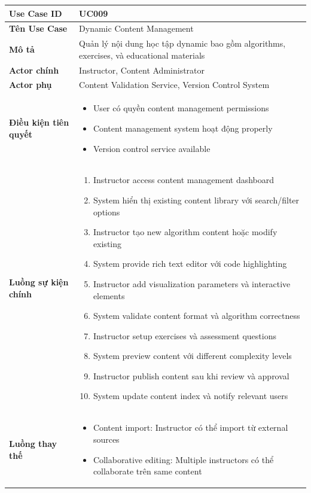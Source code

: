 \begin{longtable}{|p{4cm}|p{10cm}|}
\hline
\textbf{Use Case ID} & UC009 \\ \hline
\textbf{Tên Use Case} & Dynamic Content Management \\ \hline
\textbf{Mô tả} & Quản lý nội dung học tập dynamic bao gồm algorithms, exercises, và educational materials \\ \hline
\textbf{Actor chính} & Instructor, Content Administrator \\ \hline
\textbf{Actor phụ} & Content Validation Service, Version Control System \\ \hline
\textbf{Điều kiện tiên quyết} & 
\begin{itemize}
    \item User có quyền content management permissions
    \item Content management system hoạt động properly
    \item Version control service available
\end{itemize} \\ \hline
\textbf{Luồng sự kiện chính} & 
\begin{enumerate}
    \item Instructor access content management dashboard
    \item System hiển thị existing content library với search/filter options
    \item Instructor tạo new algorithm content hoặc modify existing
    \item System provide rich text editor với code highlighting
    \item Instructor add visualization parameters và interactive elements
    \item System validate content format và algorithm correctness
    \item Instructor setup exercises và assessment questions
    \item System preview content với different complexity levels
    \item Instructor publish content sau khi review và approval
    \item System update content index và notify relevant users
\end{enumerate} \\ \hline
\textbf{Luồng thay thế} & 
\begin{itemize}
    \item Content import: Instructor có thể import từ external sources
    \item Collaborative editing: Multiple instructors có thể collaborate trên same content

\end{itemize}
\end{longtable}
